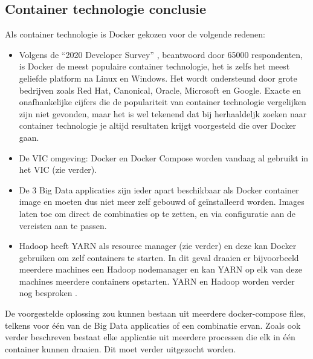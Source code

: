 \subsection{Container technologie conclusie}
Als container technologie is Docker gekozen voor de volgende redenen:
\newline
\begin{itemize}
    \item Volgens de ``2020 Developer Survey'' \autocite{Stackoverflow2020}, beantwoord door 65000 respondenten, is Docker de meest populaire container technologie, het is zelfs het meest geliefde platform na Linux en Windows.
    \newline
    Het wordt ondersteund door grote bedrijven zoals Red Hat, Canonical, Oracle, Microsoft en Google. Exacte en onafhankelijke cijfers die de populariteit van container technologie vergelijken zijn niet gevonden, maar het is wel tekenend dat bij herhaaldeljk zoeken naar container technologie je altijd resultaten krijgt voorgesteld die over Docker gaan.
    \item De VIC omgeving: Docker en Docker Compose worden vandaag al gebruikt in het VIC (zie verder).
    \item De 3 Big Data applicaties zijn ieder apart beschikbaar als Docker container image en moeten dus niet meer zelf gebouwd of geïnstalleerd worden. Images laten toe om direct de combinaties op te zetten, en via configuratie aan de vereisten aan te passen.
    \item Hadoop heeft YARN als resource manager (zie verder) en deze kan Docker gebruiken om zelf containers te starten. In dit geval draaien er bijvoorbeeld meerdere machines een Hadoop nodemanager en kan YARN op elk van deze machines meerdere containers opstarten. YARN en Hadoop worden verder nog besproken \autocite{Hadoop2023a}.
\end{itemize}

De voorgestelde oplossing zou kunnen bestaan uit meerdere docker-compose files, telkens voor één van de Big Data applicaties of een combinatie ervan. Zoals ook verder beschreven bestaat elke applicatie uit meerdere processen die elk in één container kunnen draaien. Dit moet verder uitgezocht worden.


